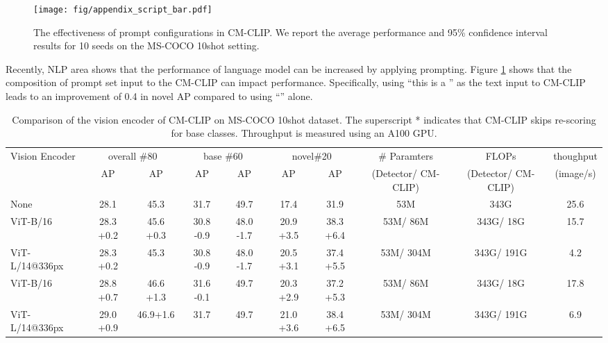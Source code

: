 \documentclass{article}
\begin{document}
\begin{figure}[h]
    \centering
    \texttt{[image: fig/appendix\_script\_bar.pdf]}
    \caption{The effectiveness of prompt configurations in CM-CLIP. We report the average performance and 95\% confidence interval results for 10 seeds on the MS-COCO 10shot setting.}
    \label{fig:enter-label}
\end{figure}

Recently, NLP area \cite{gpt, cot} shows that the performance of language model can be increased by applying prompting.
Figure \ref{fig:enter-label} shows that the composition of prompt set input to the CM-CLIP can impact performance.
Specifically, using ``this is a '' as the text input to CM-CLIP leads to an improvement of 0.4 in novel AP compared to using ``'' alone.

\begin{table}[h]
\caption{Comparison of the vision encoder of CM-CLIP on MS-COCO 10shot dataset. 
The superscript * indicates that CM-CLIP skips re-scoring for base classes. Throughput is measured using an A100 GPU.}
\centering
\begin{adjustbox}{width=1.0\textwidth}
{
\begin{tabular}{l|cc|cc|cc|c|c|c}
     \toprule
     \multirow{2}{*}{Vision Encoder}& \multicolumn{2}{c|}{overall \#80} &\multicolumn{2}{c|}{base \#60}&\multicolumn{2}{c|}{novel\#20}& \multirow{1}{*}{\# Paramters} & \multirow{1}{*}{FLOPs }& {thoughput} \\
      & AP & AP & AP & AP & AP & AP & (Detector/ CM-CLIP) & (Detector/ CM-CLIP) & (image/s) \\
     \hline
     None &28.1&45.3&31.7&49.7&17.4&31.9&  53M &343G &25.6 \\
     ViT-B/16 &28.3 {\scriptsize \color{red}+0.2}&45.6 {\scriptsize \color{red}+0.3}&30.8 {\scriptsize \color{blue}-0.9} &48.0 {\scriptsize \color{blue}-1.7}&20.9 {\scriptsize \color{red}+3.5}&38.3 {\scriptsize \color{red}+6.4}&  53M/ 86M &343G/ 18G&15.7  \\
     ViT-L/14@336px &28.3 {\scriptsize \color{red}+0.2}&45.3&30.8 {\scriptsize \color{blue}-0.9}&48.0 {\scriptsize \color{blue}-1.7}&20.5 {\scriptsize \color{red}+3.1}&37.4 {\scriptsize \color{red}+5.5}&  53M/ 304M &343G/ 191G&4.2\\
     \hline
     ViT-B/16 &28.8 {\scriptsize \color{red}+0.7}&46.6 {\scriptsize \color{red}+1.3}&31.6 {\scriptsize \color{blue}-0.1} &49.7&20.3 {\scriptsize \color{red}+2.9}&37.2 {\scriptsize \color{red}+5.3}&  53M/ 86M &343G/ 18G&17.8  \\
     ViT-L/14@336px &29.0 {\scriptsize \color{red}+0.9}&46.9{\scriptsize \color{red}+1.6}&31.7 &49.7&21.0 {\scriptsize \color{red}+3.6}&38.4 {\scriptsize \color{red}+6.5}&  53M/ 304M &343G/ 191G&6.9\\
     \bottomrule
\end{tabular}
}
\end{adjustbox}
\label{tab:cmclip}
\end{table}
\end{document}
